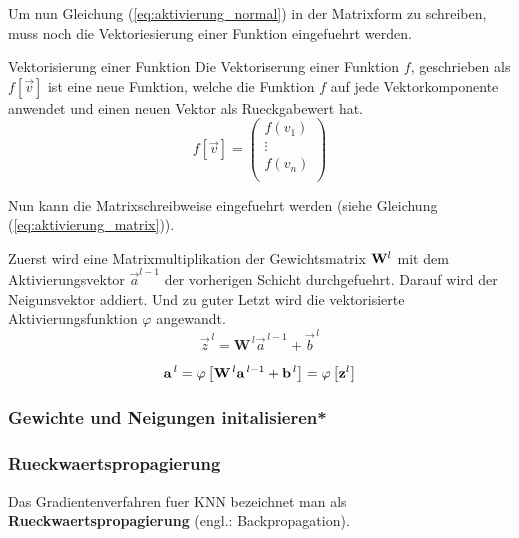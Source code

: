 \documentclass[../main]{subfiles}
\begin{document}
Um nun Gleichung (\ref{eq:aktivierung_normal}) in der Matrixform zu schreiben,
muss noch die Vektoriesierung einer Funktion eingefuehrt werden.
\par\medskip

\begin{defbox}{Vektorisierung einer Funktion}
  Die Vektoriserung einer Funktion $f$, geschrieben als $f[\vec{v}]$ ist eine neue Funktion, welche die Funktion $f$ auf jede Vektorkomponente anwendet und einen neuen Vektor als Rueckgabewert hat.
  \begin{equation*}
    f[\vec{v}]=
    \begin{pmatrix}
      f(v_1)\\
      \vdots \\
      f(v_n)\\
    \end{pmatrix}
  \end{equation*}
\end{defbox}

\par\medskip

Nun kann die Matrixschreibweise eingefuehrt werden (siehe Gleichung (\ref{eq:aktivierung_matrix})).\par
Zuerst wird eine Matrixmultiplikation der Gewichtsmatrix $\mathbf{W}^l$ mit dem
Aktivierungsvektor $\vec{a}^{l-1}$ der vorherigen Schicht durchgefuehrt. Darauf
wird der Neigunsvektor addiert. Und zu guter Letzt wird die vektorisierte
Aktivierungsfunktion $\varphi$ angewandt.
\begin{equation}\label{eq:aktivierung_matrix}
  \vec{z}^{\,l} = \mathbf{W}^{\,l} \vec{a}^{\,l-1} + \vec{b}^{\,l}
\end{equation}
\par
\begin{equation}\label{eq:aktivierung_matrix}
  \mathbf{a}^{\,l} = \varphi \left[\mathbf{W}^{\,l} \mathbf{a}^{\,l-1} + \mathbf{b}^{\,l} \right] = \varphi \left[ \mathbf{z}^l \right]
\end{equation}


\subsubsection{Gewichte und Neigungen initalisieren*}

\subsubsection{Rueckwaertspropagierung}\label{sec:backpropagation}
Das Gradientenverfahren fuer KNN bezeichnet man als
\textbf{Rueckwaertspropagierung} (engl.: Backpropagation).
\end{document}
